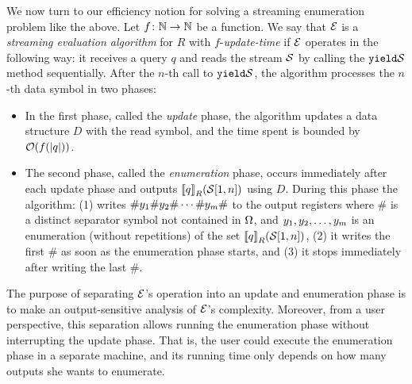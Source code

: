 
We now turn to our efficiency notion for solving a streaming enumeration problem like the above. Let $f\colon\mathbb{N}\to\mathbb{N}$ be a function. We say that $\mathcal{E}$ is a {\em streaming evaluation algorithm} for $R$ with $f$-{\em update-time} if $\mathcal{E}$ operates in the following way: it receives a query $q$ and reads the stream $\mathcal{S}$ by calling the $\texttt{yield}{\mathcal{S}}$ method sequentially. After the $n$-th call to $\texttt{yield}{\mathcal{S}}$, the algorithm processes the $n$-th data symbol in two phases:
\begin{itemize}
	\item In the first phase, called the {\em update} phase, the algorithm updates a data structure $D$ with the read symbol, and the time spent is bounded by $\mathcal{O}(f(\vert q \vert))$.
	\item The second phase, called the {\em enumeration} phase, occurs immediately after each update phase and outputs ${\llbracket{q}\rrbracket}_{R}(\mathcal{S}[1,n])$ using $D$. During this phase the algorithm:
	(1) writes $\# y_1 \# y_2\#\cdots\#y_m\#$ to the output registers where \# is a distinct separator symbol not contained in $\Omega$, and $y_1,y_2,\ldots,y_m$ is an enumeration (without repetitions) of the set ${\llbracket{q}\rrbracket}_{R}(\mathcal{S}[1,n])$,
	(2) it writes the first \# as soon as the enumeration phase starts, and 
	(3) it stops immediately after writing the last \#.
\end{itemize}
The purpose of separating $\mathcal{E}$’s operation into an update and enumeration phase is to make an output-sensitive analysis of $\mathcal{E}$’s complexity. Moreover, from a user perspective, this separation allows running the enumeration phase without interrupting the update phase. That is, the user could execute the enumeration phase in a separate machine, and its running time only depends on how many outputs she wants to enumerate.  

